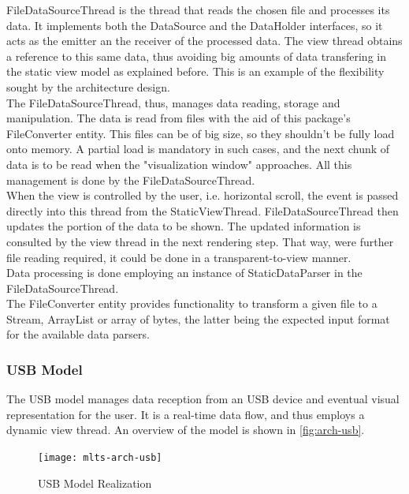 			FileDataSourceThread is the thread that reads the chosen file and processes its data. It implements both the DataSource and the DataHolder interfaces, so it acts as the emitter an the receiver of the processed data. The view thread obtains a reference to this same data, thus avoiding big amounts of data transfering in the static view model as explained before. This is an example of the flexibility sought by the architecture design.\\

			The FileDataSourceThread, thus, manages data reading, storage and manipulation. The data is read from files with the aid of this package's FileConverter entity. This files can be of big size, so they shouldn't be fully load onto memory. A partial load is mandatory in such cases, and the next chunk of data is to be read when the "visualization window" approaches. All this management is done by the FileDataSourceThread.\\

			When the view is controlled by the user, i.e. horizontal scroll, the event is passed directly into this thread from the StaticViewThread. FileDataSourceThread then updates the portion of the data to be shown. The updated information is consulted by the view thread in the next rendering step. That way, were further file reading required, it could be done in a transparent-to-view manner.\\

			Data processing is done employing an instance of StaticDataParser in the FileDataSourceThread.\\

			The FileConverter entity provides functionality to transform a given file to a Stream, ArrayList or array of bytes, the latter being the expected input format for the available data parsers.

		\subsubsection{USB Model}
			The USB model manages data reception from an USB device and eventual visual representation for the user. It is a real-time data flow, and thus employs a dynamic view thread. An overview of the model is shown in \autoref{fig:arch-usb}.\\

			\begin{figure}[h]
			\centering
		    	\texttt{[image: mlts-arch-usb]}
	  		\caption{USB Model Realization}
			\label{fig:arch-usb}
			\end{figure}

